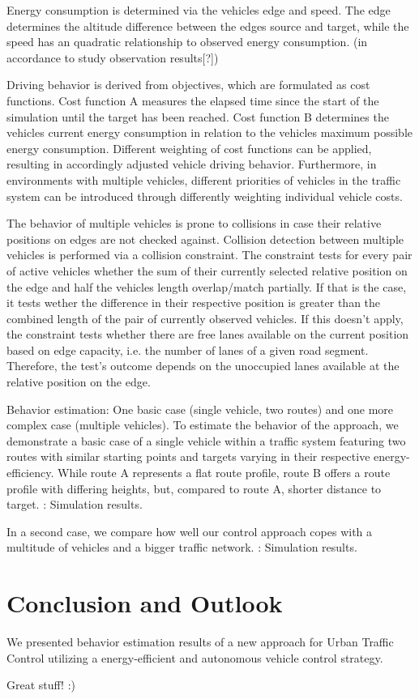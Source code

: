 \documentclass[conference]{../cls/IEEEtran}
\begin{document}
Energy consumption is determined via the vehicles edge and speed. The edge determines the altitude difference between the edges source and
target, while the speed has an quadratic relationship to observed energy
consumption. (in accordance to study observation results[?])

Driving behavior is derived from objectives, which are formulated as cost
functions. Cost function A measures the elapsed time since the start of the
simulation until the target has been reached. Cost function B
determines the vehicles current energy consumption in relation to the
vehicles maximum possible energy consumption. Different weighting of cost
functions can be applied, resulting in accordingly adjusted vehicle driving
behavior. Furthermore, in environments with multiple vehicles, different
priorities of vehicles in the traffic system can be introduced through
differently weighting individual vehicle costs.

The behavior of multiple vehicles is prone to collisions in case their relative
positions on edges are not checked against. Collision detection between
multiple vehicles is performed via a collision constraint. The constraint tests
for every pair of active vehicles whether the sum of their currently selected
relative position on the edge and half the vehicles length overlap/match
partially.
If that is the case, it tests wether the difference in their respective position 
is greater than the combined length of the pair of currently observed vehicles. 
If this doesn't apply, the constraint
tests whether there are free lanes available on the current position based on
edge capacity, i.e. the number of lanes of a given road segment. Therefore, the
test's outcome depends on the unoccupied lanes available at the relative
position on the edge.

Behavior estimation: One basic case (single vehicle, two routes) and one more complex case (multiple vehicles).
To estimate the behavior of the approach, we demonstrate a basic case of a
single vehicle within a traffic system featuring two routes with similar
starting points and targets varying in their respective energy-efficiency. While
route A represents a flat route profile, route B offers a route profile with differing heights, but, compared to route A,
shorter distance to target. : Simulation results.

In a second case, we compare how well our control approach copes with a
multitude of vehicles and a bigger traffic network. : Simulation results.

\section{Conclusion and Outlook}

We presented behavior estimation results of a new approach for Urban Traffic
Control utilizing a energy-efficient and autonomous vehicle control strategy.

Great stuff! :)



\end{document}
